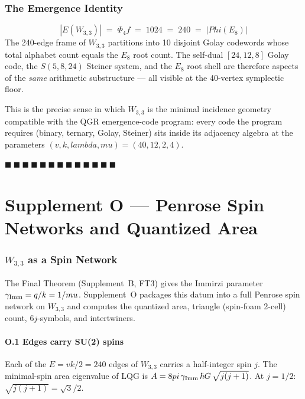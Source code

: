 \documentclass[12pt,a4paper]{article}
\def\lambda{lambda}%
\def\mu{mu}%
\def\Phi#1{Phi#1}%
\def\pi{pi}%
\def\cdot{ }%
\theoremstyle{definition}
\begin{document}
\section*{The Emergence Identity}

\[
\boxed{\;|E(W_{3,3})| \;=\; \Phi_4 \cdot f \;=\; 10\cdot 24 \;=\; 240 \;=\; |\Phi(E_8)|\;}
\]
The 240-edge frame of $W_{3,3}$ partitions into 10 disjoint Golay
codewords whose total alphabet count equals the $E_8$ root count. The
self-dual $[24,12,8]$ Golay code, the $S(5,8,24)$ Steiner system, and
the $E_8$ root shell are therefore aspects of the \emph{same} arithmetic
substructure — all visible at the 40-vertex symplectic floor.

This is the precise sense in which $W_{3,3}$ is the minimal incidence
geometry compatible with the QGR emergence-code program: every code
the program requires (binary, ternary, Golay, Steiner) sits inside its
adjacency algebra at the parameters $(v,k,\lambda,\mu)=(40,12,2,4)$.

\hfill $\blacksquare\ \blacksquare\ \blacksquare\ \blacksquare\ \blacksquare\ \blacksquare\ \blacksquare\ \blacksquare\ \blacksquare\ \blacksquare\ \blacksquare\ \blacksquare\ \blacksquare$

\clearpage
\part*{Supplement O --- Penrose Spin Networks and Quantized Area}

\section*{$W_{3,3}$ as a Spin Network}

The Final Theorem (Supplement~B, FT3) gives the Immirzi parameter
$\gamma_{\rm Imm} = q/k = 1/\mu$. Supplement~O packages this datum into
a full Penrose spin network on $W_{3,3}$ and computes the quantized
area, triangle (spin-foam 2-cell) count, $6j$-symbols, and intertwiners.

\subsection*{O.1 \quad Edges carry SU(2) spins}
Each of the $E = vk/2 = 240$ edges of $W_{3,3}$ carries a half-integer
spin $j$. The minimal-spin area eigenvalue of LQG is
$A = 8\pi\,\gamma_{\rm Imm}\,\hbar G\,\sqrt{j(j+1)}$. At $j=1/2$:
$\sqrt{j(j+1)} = \sqrt{3}/2$.
\end{document}
